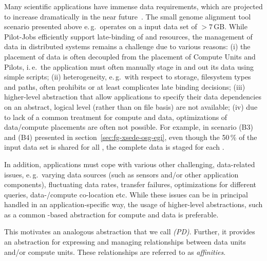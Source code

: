 \documentclass[conference]{IEEEtran}
\begin{document}


Many scientific applications have immense data requirements, which are
projected to increase dramatically in the near
future~\cite{hey2009}. The small genome alignment tool
scenario presented above e.\,g.\ operates on a input data set of
$>7$\,GB. While Pilot-Jobs efficiently support late-binding of
\computeunits and resources, the management of data in distributed
systems remains a challenge due to various reasons: (i) the placement
of data is often decoupled from the placement of Compute Units and
Pilots, i.\,e.\ the application must often manually stage in and out
its data using simple scripts;  (ii) heterogeneity, e.\,g.\ with
respect to storage, filesystem types and paths, often prohibits or at
least complicates late binding decisions; (iii) higher-level
abstraction that allow applications to specify their data dependencies
on an abstract, logical level (rather than on file basis) are not
available; (iv) due to lack of a common treatment for compute and
data, optimizations of data/compute placements are often not
possible. For example, in scenario (B3) and (B4) presented in
section~\ref{sec:fg-xsede-osg-egi}, even though the 50\,\% of the
input data set is shared for all \cus, the complete data is staged for
each \cu.

In addition, applications must cope with various other challenging,
data-related issues, e.\,g.\ varying data sources (such as sensors
and/or other application components), fluctuating data rates, transfer
failures, optimizations for different queries, data-/compute
co-location etc. While these issues can be in principal handled in an
application-specific way, the usage of higher-level abstractions, such
as a common \pilot-based abstraction for compute and data is
preferable.  


This motivates an analogous abstraction that we call \emph{\pilotdata
  (PD)}.  Further, it provides an abstraction for expressing and
managing relationships between data units and/or compute units. These
relationships are referred to as \emph{affinities}.
\end{document}
